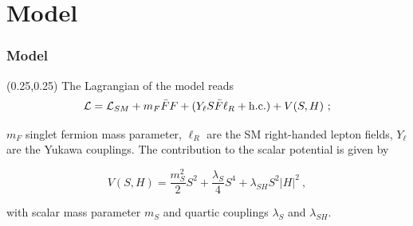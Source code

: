 \documentclass{beamer}
\numberwithin{figure}{section}
\begin{document}

	



\section{Model}
\begin{frame}
\frametitle{Model}

\begin{textblock*}{1\linewidth}(0.25\linewidth,0.25\linewidth) %
 {\centering The Lagrangian of the model reads}
 \begin{equation}\nonumber
 \mathcal{L} = \mathcal{L}_{SM} +  m_F \bar{F}F + ( Y_\ell S \bar{F}\ell_R + {\rm h.c.} ) + V(S,H)~;
 \end{equation}\label{EQ}
 
  $m_F$ singlet fermion mass parameter, $\ell_R$ are the SM right-handed lepton fields, $Y_\ell$ 
 are the Yukawa couplings. The contribution to the scalar potential is given by
 
 \begin{equation}\nonumber
 V(S,H) = \frac{m_S^2}{2} S^2 + \frac{\lambda_S}{4} S^4 + \lambda_{SH} S^2|H|^2 ~,
 \end{equation}
 
 with scalar mass parameter $m_S$ and quartic couplings $\lambda_{S}$ and $\lambda_{SH}$.
 
\end{textblock*}


\end{frame}
\end{document}
